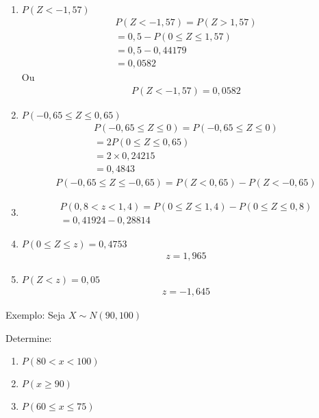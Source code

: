 \documentclass[11pt,a4paper]{book}
\begin{document}
\begin{description}
\begin{enumerate}
    \item $ P(Z< -1,57)$
      \begin{align*}
        P(Z< -1,57) = P(Z> 1,57)\\
        =0,5 - P(0 \leq Z \leq 1,57) \\
        = 0,5 - 0,44179 \\
        = 0,0582
      \end{align*}
      Ou 
      \begin{align*}
        P(Z < -1,57) = 0,0582
      \end{align*}
    \item $P(-0,65 \leq Z \leq 0,65)$
      \begin{align*}
        P(-0,65 \leq Z \leq 0) = P(-0,65 \leq Z \leq 0) \\
        =2 P(0 \leq Z \leq 0,65) \\
        =2 \times 0,24215 \\
        =0,4843
      \end{align*}
      \begin{align*}
        P( -0,65 \leq Z \leq -0,65 ) = P(Z < 0,65) - P(Z < -0,65)
      \end{align*}
    \item 
      \begin{align*}
        P(0,8 < z < 1,4)  = P(0 \leq Z \leq 1,4) - P(0 \leq Z \leq 0,8) \\
        = 0,41924 - 0,28814
      \end{align*}
    \item $P(0 \leq Z \leq z) = 0,4753$
      \begin{align*}
       z= 1,965 
      \end{align*}
    \item $P(Z < z) = 0,05$
      \begin{align*}
       z= -1,645 
      \end{align*}
      \end{enumerate}

    \item {Exemplo:} Seja $X \sim N(90,100)$ \\
      \begin{description}
        \item  {Determine:}
      \begin{enumerate}[label=(\alph*)]
        \item $P(80 < x < 100)$
        \item $P(x \geq  90)$
        \item $P(60 \leq x \leq 75 )$
      \end{enumerate}


\end{description}
\end{description}
\end{document}

